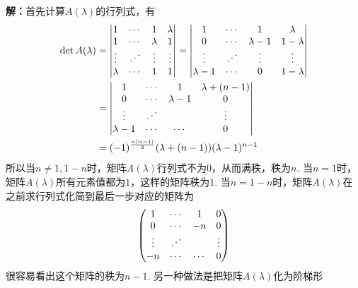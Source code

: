 {\bf 解：}首先计算$A(\lambda)$的行列式，有
\begin{align*}
    \det A(\lambda) & = \begin{vmatrix} 1 & \cdots & 1 & \lambda \\ 1 & \cdots & \lambda & 1 \\ \vdots & \reflectbox{$\ddots$} & \vdots & \vdots \\ \lambda & \cdots & 1 & 1 \end{vmatrix} = \begin{vmatrix} 1 & \cdots & 1 & \lambda \\ 0 & \cdots & \lambda-1 & 1-\lambda \\ \vdots & \reflectbox{$\ddots$} & \vdots & \vdots \\ \lambda-1 & \cdots & 0 & 1-\lambda \end{vmatrix} \\
    & = \begin{vmatrix} 1 & \cdots & 1 & \lambda + (n-1) \\ 0 & \cdots & \lambda-1 & 0 \\ \vdots & \reflectbox{$\ddots$} & & \vdots \\ \lambda-1 & \cdots & \cdots & 0 \end{vmatrix} \\
    & = (-1)^{\frac{n(n-1)}{2}} (\lambda+(n-1))(\lambda-1)^{n-1}
\end{align*}
所以当$n\neq 1, 1-n$时，矩阵$A(\lambda)$行列式不为$0$，从而满秩，秩为$n$. 当$n = 1$时，矩阵$A(\lambda)$所有元素值都为$1$，这样的矩阵秩为$1$. 当$n = 1-n$时，矩阵$A(\lambda)$在之前求行列式化简到最后一步对应的矩阵为
$$\begin{pmatrix} 1 & \cdots & 1 & 0 \\ 0 & \cdots & -n & 0 \\ \vdots & \reflectbox{$\ddots$} & & \vdots \\ -n & \cdots & \cdots & 0 \end{pmatrix}$$
很容易看出这个矩阵的秩为$n-1$. 另一种做法是把矩阵$A(\lambda)$化为阶梯形
